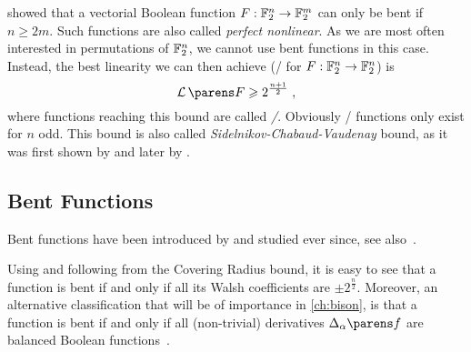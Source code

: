 \textcite{EC:Nyberg91} showed that a vectorial Boolean function $F : \mathbb{F}_2^n \to \mathbb{F}_2^m$ can only be bent if $n \geqslant 2m$.
Such functions are also called \emph{perfect nonlinear}.
As we are most often interested in permutations of $\mathbb{F}_2^n$, we cannot use bent functions in this case.
Instead, the best linearity we can then achieve (\ie/ for $F : \mathbb{F}_2^n \to \mathbb{F}_2^n$) is
\begin{equation*}
    \linearity{F} \geqslant 2^{\frac{n+1}{2}}\;,
\end{equation*}
where functions reaching this bound are called \emph{\AB/}.
Obviously \AB/ functions only exist for $n$ odd.
This bound is also called \emph{Sidelnikov-Chabaud-Vaudenay} bound, as it was first shown by \textcite{SMD:Sidelnikov71} and later by \textcite{EC:ChaVau94}.

\subsection{Bent Functions}
Bent functions have been introduced by \textcite{Rothaus76} and studied ever since, see also~\cite[Section~8.6]{BMM:Carlet10a}.

Using  and following from the Covering Radius bound, it is easy to see that a function is bent if and only if all its Walsh coefficients are $\pm2^{\frac{n}{2}}$.
Moreover, an alternative classification that will be of importance in \cref{ch:bison}, is that a function is bent if and only if all (non-trivial) derivatives $\derive{\alpha}{f}$ are balanced Boolean functions~\cite{EC:MeiSta89}.


